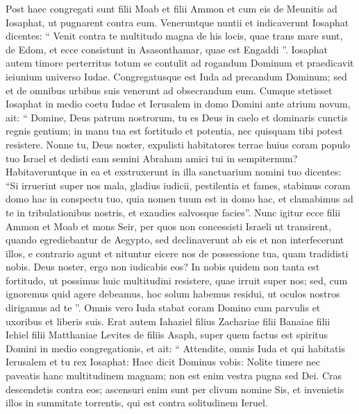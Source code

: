 \begin{biblechapter}
\begin{biblechapter}
\begin{biblechapter}
\begin{biblechapter}
\begin{biblechapter}
\begin{biblechapter}
\begin{biblechapter}
\begin{biblechapter}
\begin{biblechapter}
\begin{biblechapter}
\begin{biblechapter}
\begin{biblechapter}
\begin{biblechapter}
\begin{biblechapter}
\begin{biblechapter}
\begin{biblechapter}
\begin{biblechapter}
\begin{biblechapter}
\begin{biblechapter}
\begin{biblechapter}
\verse Post haec congregati sunt filii Moab et filii Ammon et cum eis de Meunitis ad Iosaphat, ut pugnarent contra eum. 
\verse Veneruntque nuntii et indicaverunt Iosaphat dicentes: “ Venit contra te multitudo magna de his locis, quae trans mare sunt, de Edom, et ecce consistunt in Asasonthamar, quae est Engaddi ”.
 \verse Iosaphat autem timore perterritus totum se contulit ad rogandum Dominum et praedicavit ieiunium universo Iudae. 
\verse Congregatusque est Iuda ad precandum Dominum; sed et de omnibus urbibus suis venerunt ad obsecrandum eum.
 \verse Cumque stetisset Iosaphat in medio coetu Iudae et Ierusalem in domo Domini ante atrium novum, 
\verse ait: “ Domine, Deus patrum nostrorum, tu es Deus in caelo et dominaris cunctis regnis gentium; in manu tua est fortitudo et potentia, nec quisquam tibi potest resistere. 
\verse Nonne tu, Deus noster, expulisti habitatores terrae huius coram populo tuo Israel et dedisti eam semini Abraham amici tui in sempiternum? 
\verse Habitaveruntque in ea et exstruxerunt in illa sanctuarium nomini tuo dicentes: 
\verse “Si irruerint super nos mala, gladius iudicii, pestilentia et fames, stabimus coram domo hac in conspectu tuo, quia nomen tuum est in domo hac, et clamabimus ad te in tribulationibus nostris, et exaudies salvosque facies”. 
\verse Nunc igitur ecce filii Ammon et Moab et mons Seir, per quos non concessisti Israeli ut transirent, quando egrediebantur de Aegypto, sed declinaverunt ab eis et non interfecerunt illos, 
\verse e contrario agunt et nituntur eicere nos de possessione tua, quam tradidisti nobis. 
\verse Deus noster, ergo non iudicabis eos? In nobis quidem non tanta est fortitudo, ut possimus huic multitudini resistere, quae irruit super nos; sed, cum ignoremus quid agere debeamus, hoc solum habemus residui, ut oculos nostros dirigamus ad te ”. 
\verse Omnis vero Iuda stabat coram Domino cum parvulis et uxoribus et liberis suis.
 \verse Erat autem Iahaziel filius Zachariae filii Banaiae filii Iehiel filii Matthaniae Levites de filiis Asaph, super quem factus est spiritus Domini in medio congregationis, 
\verse et ait: “ Attendite, omnis Iuda et qui habitatis Ierusalem et tu rex Iosaphat: Haec dicit Dominus vobis: Nolite timere nec paveatis hanc multitudinem magnam; non est enim vestra pugna sed Dei. 
\verse Cras descendetis contra eos; ascensuri enim sunt per clivum nomine Sis, et invenietis illos in summitate torrentis, qui est contra solitudinem Ieruel. 

\end{biblechapter}
\end{biblechapter}
\end{biblechapter}
\end{biblechapter}
\end{biblechapter}
\end{biblechapter}
\end{biblechapter}
\end{biblechapter}
\end{biblechapter}
\end{biblechapter}
\end{biblechapter}
\end{biblechapter}
\end{biblechapter}
\end{biblechapter}
\end{biblechapter}
\end{biblechapter}
\end{biblechapter}
\end{biblechapter}
\end{biblechapter}
\end{biblechapter}

